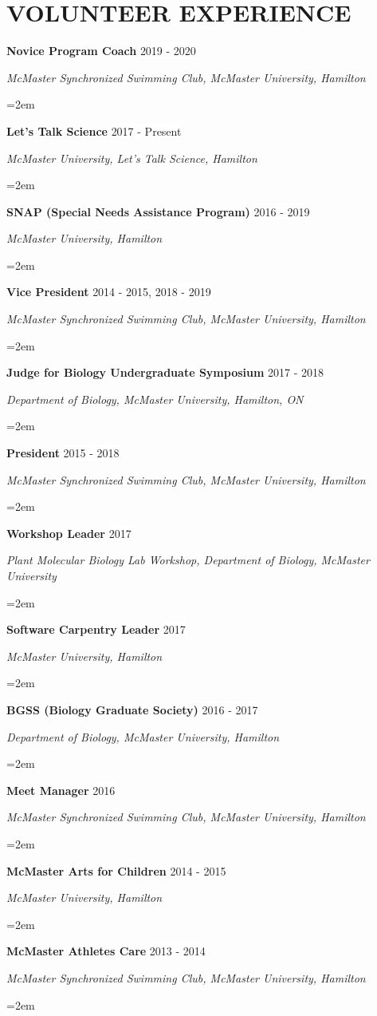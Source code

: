 \documentclass[paper=a4,fontsize=11pt]{scrartcl}	 			%
\newcommand{\sepspace}{\vspace*{1em}}			%
\newcommand{\NewPart}[1]{\section*{\uppercase{#1}}}
\newcommand{\EducationEntry}[4]{
		\noindent \textbf{#1} \hfill 					%
		\colorbox{White}{%
			\parbox{10em}{%
			\hfill\color{Black}#2}} \par				%
		\noindent \textit{#3} \par					%
		\noindent\hangindent=2em\hangafter=0 \small #4 	%
		\normalsize \par}
\newcommand{\WorkEntry}[4]{						%
		\noindent \textbf{#1} \hfill 					%
		\colorbox{White}{\color{Black}#2} \par		%
		\noindent \textit{#3} \par					%
		\noindent\hangindent=2em\hangafter=0 \small #4 	%
		\normalsize \par}
\begin{document}
%
\NewPart{Volunteer Experience}{}
\WorkEntry{Novice Program Coach}{2019 - 2020}{McMaster Synchronized Swimming Club, McMaster University, Hamilton}{}
\WorkEntry{Let's Talk Science}{2017 - Present}{McMaster University, Let's Talk Science, Hamilton}{}
\WorkEntry{SNAP (Special Needs Assistance Program)}{2016 - 2019}{McMaster University, Hamilton}{}
\WorkEntry{Vice President}{2014 - 2015, 2018 - 2019}{McMaster Synchronized Swimming Club, McMaster University, Hamilton}{}
\WorkEntry{Judge for Biology Undergraduate Symposium}{2017 - 2018}{Department of Biology, McMaster University, Hamilton, ON}{}
\WorkEntry{President}{2015 - 2018}{McMaster Synchronized Swimming Club, McMaster University, Hamilton}{}
\WorkEntry{Workshop Leader}{2017}{Plant Molecular Biology Lab Workshop, Department of Biology, McMaster University}{}
\WorkEntry{Software Carpentry Leader}{2017}{McMaster University, Hamilton}{}
\WorkEntry{BGSS (Biology Graduate Society)}{2016 - 2017}{Department of Biology, McMaster University, Hamilton}{}
\WorkEntry{Meet Manager}{2016}{McMaster Synchronized Swimming Club, McMaster University, Hamilton}{}
\WorkEntry{McMaster Arts for Children}{2014 - 2015}{McMaster University, Hamilton}{}
\WorkEntry{McMaster Athletes Care}{2013 - 2014}{McMaster Synchronized Swimming Club, McMaster University, Hamilton}{}
\end{document}
